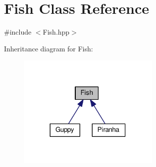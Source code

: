 \hypertarget{classFish}{}\section{Fish Class Reference}
\label{classFish}


{\ttfamily \#include $<$Fish.\+hpp$>$}



Inheritance diagram for Fish\+:
\nopagebreak
\begin{figure}[H]
\begin{center}
\leavevmode
\includegraphics[width=194pt]{classFish__inherit__graph}
\end{center}
\end{figure}
